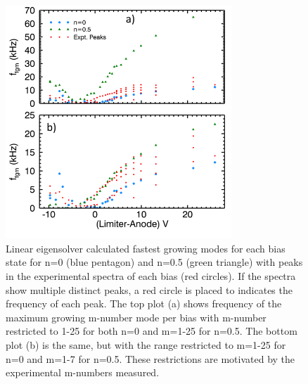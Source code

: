 \documentclass[aip,pop,amsmath,amssymb,reprint,superscriptaddress]{revtex4-1} %
\begin{document}
\begin{figure}[!htbp]
\centerline{
\includegraphics[width=8.5cm]{fgm_vs_bias_lab}}%
\caption{\label{fig:fgm_vs_bias} Linear eigensolver calculated fastest growing modes for each bias state for n=0 (blue pentagon) and n=0.5 (green triangle) with peaks in the experimental spectra of each bias (red circles). If the spectra show multiple distinct peaks, a red circle is placed to indicates the frequency of each peak. The top plot (a) shows frequency of the maximum growing m-number mode per bias with m-number restricted to 1-25 for both n=0 and m=1-25 for n=0.5. The bottom plot (b) is the same, but with the range restricted to m=1-25 for n=0 and m=1-7 for n=0.5. These restrictions are motivated by the experimental m-numbers measured.}
\end{figure}
\end{document}
